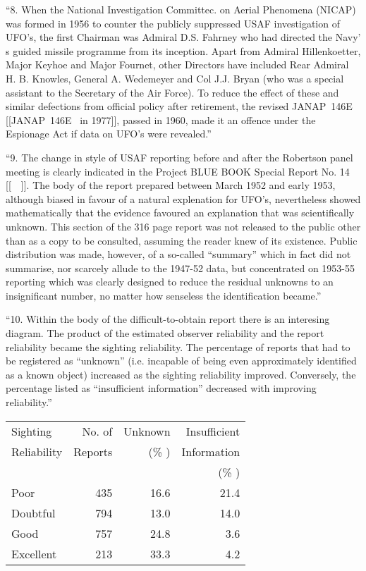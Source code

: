 \begin{svgraybox}
``8. When the National Investigation Committec. on Aerial Phenomena
(NICAP) was formed in 1956 to counter the publicly suppressed USAF
investigation of UFO's, the first Chairman was Admiral D.S. Fahrney
who had directed the Navy' s guided missile programme from its
inception. Apart from Admiral Hillenkoetter, Major Keyhoe and
Major Fournet, other Directors have included Rear Admiral H. B. Knowles,
General A. Wedemeyer and Col J.J. Bryan (who was a special assistant
to the Secretary of the Air Force). To reduce the effect of these
and similar defections from official policy after retirement, the
revised JANAP~146E
[[JANAP~146E~\cite{JANAP_146E} in 1977]], passed in 1960, made it an offence under the
Espionage Act if data on UFO's were revealed.''

``9. The change in style of USAF reporting before and after the
Robertson panel meeting is clearly indicated in the Project BLUE BOOK
Special Report No. 14 [[~\cite{BlueBookSR14-1955}~]]. The body of the report prepared between
March 1952 and early 1953, although biased in favour of a natural
explenation for UFO's, nevertheless showed mathematically that the
evidence favoured an explanation that was scientifically unknown.
This section of the 316 page report was not released to the public
other than as a copy to be consulted, assuming the reader knew of
its existence. Public distribution was made, however, of a so-called
``summary'' which in fact did not summarise, nor scarcely
allude to the 1947-52 data, but concentrated on 1953-55 reporting
which was clearly designed to reduce the residual unknowns to an
insignificant number, no matter how senseless the identification
became.''

``10. Within the body of the difficult-to-obtain report there
is an interesing diagram. The product of the estimated observer
reliability and the report reliability became the sighting
reliability. The percentage of reports that had to be registered
as ``unknown'' (i.e. incapable of being even approximately identified
as a known object) increased as the sighting reliability improved.
Conversely, the percentage listed as ``insufficient information''
decreased with improving reliability.''

\begin{center}
\begin{tabular}{ l r r r}
\hline
Sighting&No. of&Unknown&Insufficient\\
Reliability&Reports&({\% })&Information\\
&&&({\% })\\
\hline
Poor & 435         &  16.6  &     21.4 \\
Doubtful & 794     &  13.0  &    14.0  \\
Good & 757         &  24.8  &    3.6   \\
Excellent & 213    &  33.3  &   4.2    \\
\hline
\end{tabular}
\end{center}



\end{svgraybox}
